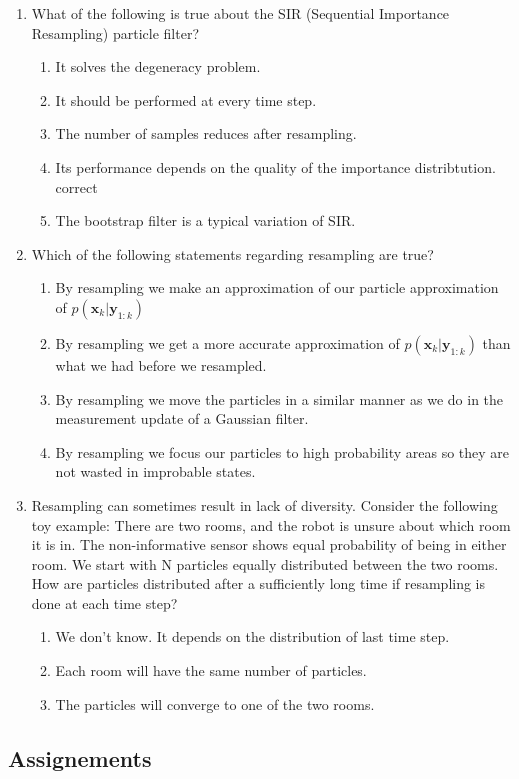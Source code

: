 \begin{enumerate}
\item  What of the following is true about the SIR (Sequential Importance Resampling) particle filter?

\begin{enumerate}
\item It solves the degeneracy problem.
\item It should be performed at every time step. 
\item The number of samples reduces after resampling. 
\item Its performance depends on the quality of the importance distribtution. correct 
\item The bootstrap filter is a typical variation of SIR. 
\end{enumerate}

\item Which of the following statements regarding resampling are true?

\begin{enumerate}
\item By resampling we make an approximation of our particle approximation of $p(\mathbf{x}_k | \mathbf{y}_{1:k})$
\item By resampling we get a more accurate approximation of $p(\mathbf{x}_k | \mathbf{y}_{1:k})$ than what we had before we resampled.  
\item By resampling we move the particles in a similar manner as we do in the measurement update of a Gaussian filter. 
\item By resampling we focus our particles to high probability areas so they are not wasted in improbable states.  
\end{enumerate}

\item Resampling can sometimes result in lack of diversity.
Consider the following toy example: There are two rooms, and the robot is unsure about which room it is in. The non-informative sensor shows equal probability of being in either room. We start with N particles equally distributed between the two rooms. How are particles distributed after a sufficiently long time if resampling is done at each time step?

\begin{enumerate}
\item We don't know. It depends on the distribution of last time step. 
\item Each room will have the same number of particles. 
\item The particles will converge to one of the two rooms.   
\end{enumerate}

\end{enumerate}

\subsection{Assignements}


